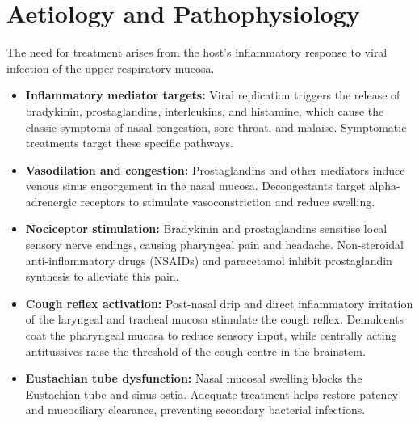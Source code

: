 \section*{Aetiology and Pathophysiology}
The need for treatment arises from the host's inflammatory response to viral infection of the upper respiratory mucosa.
\begin{itemize}
    \item \textbf{Inflammatory mediator targets:} Viral replication triggers the release of bradykinin, prostaglandins, interleukins, and histamine, which cause the classic symptoms of nasal congestion, sore throat, and malaise. Symptomatic treatments target these specific pathways.
    \item \textbf{Vasodilation and congestion:} Prostaglandins and other mediators induce venous sinus engorgement in the nasal mucosa. Decongestants target alpha-adrenergic receptors to stimulate vasoconstriction and reduce swelling.
    \item \textbf{Nociceptor stimulation:} Bradykinin and prostaglandins sensitise local sensory nerve endings, causing pharyngeal pain and headache. Non-steroidal anti-inflammatory drugs (NSAIDs) and paracetamol inhibit prostaglandin synthesis to alleviate this pain.
    \item \textbf{Cough reflex activation:} Post-nasal drip and direct inflammatory irritation of the laryngeal and tracheal mucosa stimulate the cough reflex. Demulcents coat the pharyngeal mucosa to reduce sensory input, while centrally acting antitussives raise the threshold of the cough centre in the brainstem.
    \item \textbf{Eustachian tube dysfunction:} Nasal mucosal swelling blocks the Eustachian tube and sinus ostia. Adequate treatment helps restore patency and mucociliary clearance, preventing secondary bacterial infections.
\end{itemize}

